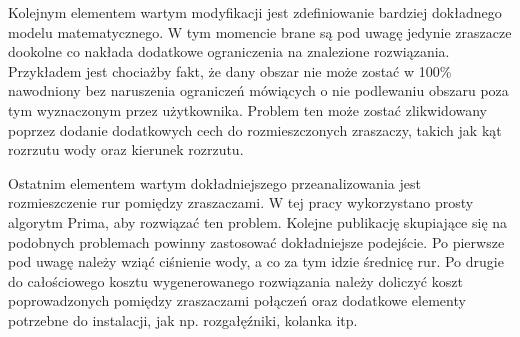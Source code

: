 \documentclass[twoside]{iisthesis}
\begin{document}
Kolejnym elementem wartym modyfikacji jest zdefiniowanie bardziej dokładnego modelu matematycznego. W tym momencie brane są pod uwagę jedynie zraszacze dookolne co nakłada dodatkowe ograniczenia na znalezione rozwiązania. Przykładem jest chociażby fakt, że dany obszar nie może zostać w 100\% nawodniony bez naruszenia ograniczeń mówiących o nie podlewaniu obszaru poza tym wyznaczonym przez użytkownika. Problem ten może zostać zlikwidowany poprzez dodanie dodatkowych cech do rozmieszczonych zraszaczy, takich jak kąt rozrzutu wody oraz kierunek rozrzutu.

Ostatnim elementem wartym dokładniejszego przeanalizowania jest rozmieszczenie rur pomiędzy zraszaczami. W tej pracy wykorzystano prosty algorytm Prima, aby rozwiązać ten problem. Kolejne publikację skupiające się na podobnych problemach powinny zastosować dokładniejsze podejście. Po pierwsze pod uwagę należy wziąć ciśnienie wody, a co za tym idzie średnicę rur. Po drugie do całościowego kosztu wygenerowanego rozwiązania należy doliczyć koszt poprowadzonych pomiędzy zraszaczami połączeń oraz dodatkowe elementy potrzebne do instalacji, jak np. rozgałęźniki, kolanka itp.



\end{document}
